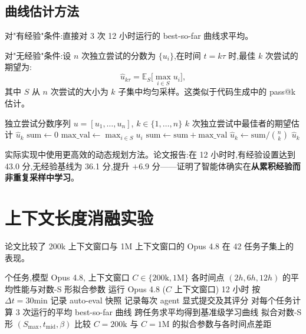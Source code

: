 \documentclass[a4paper,11pt]{article}
\begin{document}
\subsection{曲线估计方法}

对"有经验"条件:直接对 3 次 12 小时运行的 best-so-far 曲线求平均。

对"无经验"条件:设 $n$ 次独立尝试的分数为 $\{u_{i}\}$,在时间 $t = k\tau$ 时,最佳 $k$ 次尝试的期望为:
\[
    \hat{u}_{k\tau} = \mathbb{E}_{S}\!\biggl[ \max_{i \in S} u_{i} \biggr],
\]
其中 $S$ 从 $n$ 次尝试的大小为 $k$ 子集中均匀采样。这类似于代码生成中的 pass@k 估计。

\begin{algorithm}[H]
\caption{无经验条件的 Best-of-k 估计}
\label{alg:pass-at-k}
\begin{algorithmic}[1]
\REQUIRE 独立尝试分数序列 $u = [u_{1}, \ldots, u_{n}]$, $k \in \{1, \ldots, n\}$
\ENSURE $k$ 次独立尝试中最佳者的期望估计 $\hat{u}_{k}$
\STATE $\mathrm{sum} \gets 0$
    \STATE $\mathrm{max\_val} \gets \max_{i \in S} u_{i}$
    \STATE $\mathrm{sum} \gets \mathrm{sum} + \mathrm{max\_val}$
\ENDFOR
\STATE $\hat{u}_{k} \gets \mathrm{sum} / \binom{n}{k}$
\RETURN $\hat{u}_{k}$
\end{algorithmic}
\end{algorithm}

实际实现中使用更高效的动态规划方法。论文报告:在 12 小时时,有经验设置达到 43.0 分,无经验基线为 36.1 分,提升 $+6.9$ 分——证明了智能体确实在\textbf{从累积经验而非重复采样中学习}。

\section{上下文长度消融实验}

论文比较了 200k 上下文窗口与 1M 上下文窗口的 Opus 4.8 在 42 任务子集上的表现。

\begin{algorithm}[H]
\caption{上下文长度消融实验流程}
\label{alg:ctx-ablation}
\begin{algorithmic}[1]
 个任务,模型 Opus 4.8, 上下文窗口 $C \in \{200\text{k}, 1\text{M}\}$
\ENSURE 各时间点 $(2h, 6h, 12h)$ 的平均性能与对数-S 形拟合参数
            \STATE 运行 Opus 4.8 ($C$ 上下文窗口) 12 小时
            \STATE 按 $\Delta t = 30\text{min}$ 记录 auto-eval 快照
            \STATE 记录每次 agent 显式提交及其评分
        \ENDFOR
    \ENDFOR
    \STATE 对每个任务计算 3 次运行的平均 best-so-far 曲线
    \STATE 跨任务求平均得到基准级学习曲线
    \STATE 拟合对数-S 形 $(S_{\max}, t_{\mathrm{mid}}, \beta)$
\ENDFOR
\STATE 比较 $C=200\text{k}$ 与 $C=1\text{M}$ 的拟合参数与各时间点差距
\end{algorithmic}
\end{algorithm}
\end{document}
